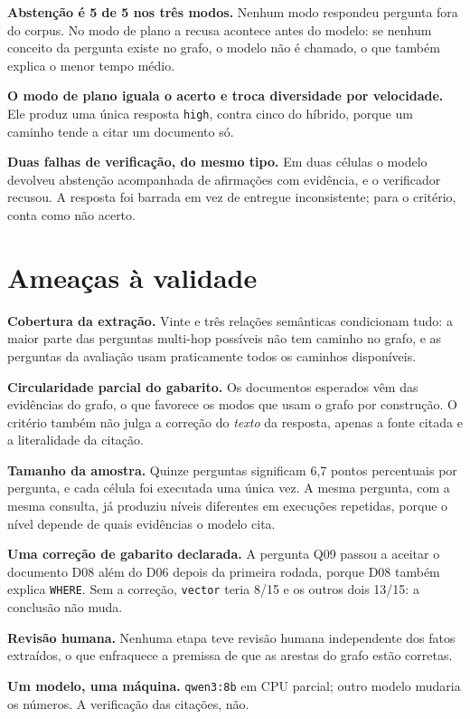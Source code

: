 \documentclass[12pt]{article}
\begin{document}
\textbf{Abstenção é 5 de 5 nos três modos.} Nenhum modo respondeu pergunta fora do corpus. No modo
de plano a recusa acontece antes do modelo: se nenhum conceito da pergunta existe no grafo, o
modelo não é chamado, o que também explica o menor tempo médio.

\textbf{O modo de plano iguala o acerto e troca diversidade por velocidade.} Ele produz uma única
resposta \texttt{high}, contra cinco do híbrido, porque um caminho tende a citar um documento só.

\textbf{Duas falhas de verificação, do mesmo tipo.} Em duas células o modelo devolveu abstenção
acompanhada de afirmações com evidência, e o verificador recusou. A resposta foi barrada em vez de
entregue inconsistente; para o critério, conta como não acerto.

\section{Ameaças à validade}

\textbf{Cobertura da extração.} Vinte e três relações semânticas condicionam tudo: a maior parte
das perguntas multi-hop possíveis não tem caminho no grafo, e as perguntas da avaliação usam
praticamente todos os caminhos disponíveis.

\textbf{Circularidade parcial do gabarito.} Os documentos esperados vêm das evidências do grafo, o
que favorece os modos que usam o grafo por construção. O critério também não julga a correção do
\emph{texto} da resposta, apenas a fonte citada e a literalidade da citação.

\textbf{Tamanho da amostra.} Quinze perguntas significam 6,7 pontos percentuais por pergunta, e
cada célula foi executada uma única vez. A mesma pergunta, com a mesma consulta, já produziu
níveis diferentes em execuções repetidas, porque o nível depende de quais evidências o modelo cita.

\textbf{Uma correção de gabarito declarada.} A pergunta Q09 passou a aceitar o documento D08 além
do D06 depois da primeira rodada, porque D08 também explica \texttt{WHERE}. Sem a correção,
\texttt{vector} teria 8/15 e os outros dois 13/15: a conclusão não muda.

\textbf{Revisão humana.} Nenhuma etapa teve revisão humana independente dos fatos extraídos, o que
enfraquece a premissa de que as arestas do grafo estão corretas.

\textbf{Um modelo, uma máquina.} \texttt{qwen3:8b} em CPU parcial; outro modelo mudaria os
números. A verificação das citações, não.
\end{document}
